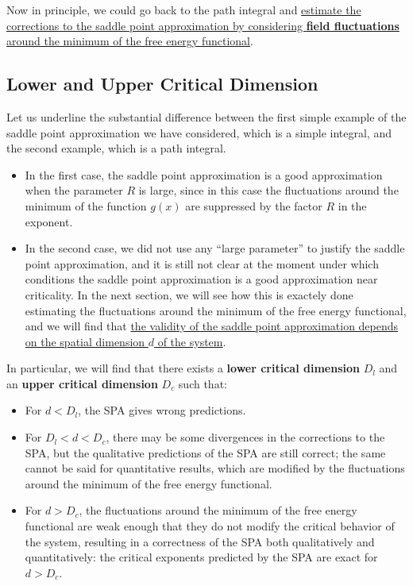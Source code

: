 Now in principle, we could go back to the path integral and \uline{estimate the corrections to the saddle point approximation by considering \textbf{field fluctuations} around the minimum of the free energy functional}.

\subsection{Lower and Upper Critical Dimension}

Let us underline the substantial difference between the first simple example of the saddle point approximation we have considered, which is a simple integral, and the second example, which is a path integral.
\begin{itemize}
    \item In the first case, the saddle point approximation is a good approximation when the parameter \(R\) is large, since in this case the fluctuations around the minimum of the function \(g(x)\) are suppressed by the factor \(R\) in the exponent.
    \item In the second case, we did not use any ``large parameter'' to justify the saddle point approximation, and it is still not clear at the moment under which conditions the saddle point approximation is a good approximation near criticality. In the next section, we will see how this is exactely done estimating the fluctuations around the minimum of the free energy functional, and we will find that \uline{the validity of the saddle point approximation depends on the spatial dimension \(d\) of the system}.
\end{itemize}
In particular, we will find that there exists a \textbf{lower critical dimension} \(D_l\) and an \textbf{upper critical dimension} \(D_c\) such that:
\begin{itemize}
    \item For \(d < D_l\), the SPA gives wrong predictions.
    \item For \(D_l < d < D_c\), there may be some divergences in the corrections to the SPA, but the qualitative predictions of the SPA are still correct; the same cannot be said for quantitative results, which are modified by the fluctuations around the minimum of the free energy functional.
    \item For \(d > D_c\), the fluctuations around the minimum of the free energy functional are weak enough that they do not modify the critical behavior of the system, resulting in a correctness of the SPA both qualitatively and quantitatively: the critical exponents predicted by the SPA are exact for \(d > D_c\).
\end{itemize}

